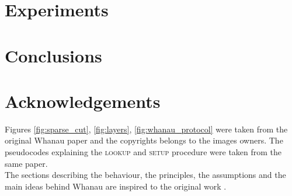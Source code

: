 \documentclass[conference, 10pt]{IEEEtran}
\begin{document}


\section{Experiments\label{exper}}



\section{Conclusions\label{concl}}



\section{Acknowledgements}

Figures \ref{fig:sparse_cut}, \ref{fig:layers}, \ref{fig:whanau_protocol} were taken from the original Whanau paper \cite{lesniewski2010whanau} and the copyrights belongs to the images owners. The pseudocodes explaining the \textsc{lookup} and \textsc{setup} procedure were taken from the same paper.\\
The sections describing the behaviour, the principles, the assumptions and the main ideas behind Whanau are inspired to the original work \cite{lesniewski2010whanau}.

%
%
%





%
\end{document}
